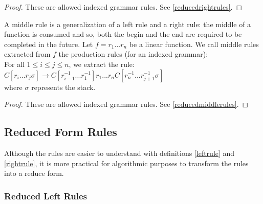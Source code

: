 \documentclass[10pt,a4paper,draft]{article}
\begin{document}
\begin{proof}
These are allowed indexed grammar rules. See \ref{reducedrightrules}.
\end{proof}

\begin{definition}
\label{middleRule}
A middle rule is a generalization of a left rule and a right rule: the middle of a function is consumed and so, both the begin and the end are required to be completed in the future. Let $f=r_1...r_n$ be a linear function. We call middle rules extracted from $f$ the production rules (for an indexed grammar):\\
For all $ 1 \leq i \leq j \leq n $, we extract the rule:\\
$C[r_i ... r_j \sigma] \rightarrow C[r_{i-1}^{-1} ... r_1^{-1}]r_1 ... r_n C[r_n^{-1} ... r_{j+1}^{-1} \sigma]$ \\
where $\sigma$ represents the stack.
\end{definition}

\begin{proof}
These are allowed indexed grammar rules. See \ref{reducedmiddlerules}.
\end{proof}

\subsection{Reduced Form Rules}

Although the rules are easier to understand with definitions \ref{leftrule} and \ref{rightrule}, it is more practical for algorithmic purposes to transform the rules into a reduce form.

\subsubsection{Reduced Left Rules}
\label{reducedleftrules}
\end{document}
